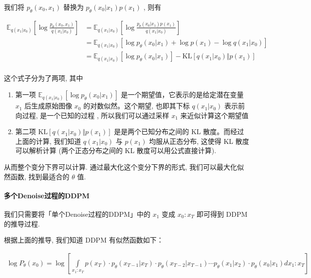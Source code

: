 我们将 $p_\theta(x_0,x_1)$ 替换为 $p_\theta(x_0|x_1)p(x_1)$ , 则有


\begin{equation}
\begin{aligned}
\mathbb{E}_{q(x_1|x_0)}\left[\log\frac{p_\theta(x_0,x_1)}{q(x_1|x_0)}\right]&=\mathbb{E}_{q(x_1|x_0)}\left[\log\frac{p_\theta(x_0|x_1)p(x_1)}{q(x_1|x_0)}\right]\\
&=\mathbb{E}_{q(x_1|x_0)}\left[\log{ p_\theta(x_0|x_1) }+\log{p(x_1)}-\log{q(x_1|x_0)}\right]\\
&=\mathbb{E}_{q(x_1|x_0)}\left[\log{ p_\theta(x_0|x_1) }\right]-\text{KL}\left[q(x_1|x_0)\Vert p(x_1)\right]\\
\end{aligned}
\end{equation}


这个式子分为了两项, 其中
\begin{enumerate}
    \item 第一项 $\mathbb{E}_{q(x_1|x_0)}\left[\log{ p_\theta(x_0|x_1) }\right]$ 是一个期望值，它表示的是给定潜在变量 $x_1$ 后生成原始图像 $x_0$ 的对数似然。这个期望, 也即其下标 $q(x_1|x_0)$ 表示前向过程, 是一个已知的过程 , 所以我们可以通过采样 $x_1$ 来近似计算这个期望值
    \item 第二项 $\text{KL}\left[q(x_1|x_0)\Vert p(x_1)\right]$ 是是两个已知分布之间的 KL 散度。而经过上面的计算, 我们知道 $q(x_1|x_0)$ 与 $p(x_1)$ 均服从正态分布, 这使得 KL 散度可以解析计算 (两个正态分布之间的 KL 散度可以用公式直接计算).
\end{enumerate}

从而整个变分下界可以计算. 通过最大化这个变分下界的形式, 我们可以最大化似然函数, 找到最适合的 $\theta$ 值.


\paragraph{多个Denoise过程的DDPM}

我们只需要将「单个Denoise过程的DDPM」中的 $x_1$ 变成 $x_0:x_T$ 即可得到 DDPM 的推导过程.

根据上面的推导, 我们知道 DDPM 有似然函数如下：

\begin{equation}
\begin{aligned}
	\log P_\theta(x_0)=\log\left[\int\limits_{x_1:x_T}p (x_T)\cdot p_\theta(x_{T-1}|x_T)\cdot p_\theta(x_{T-2}|x_{T-1})\cdots p_\theta(x_1|x_2)\cdot p_\theta (x_0|x_1)dx_1:x_T\right]
\end{aligned}
\end{equation}



